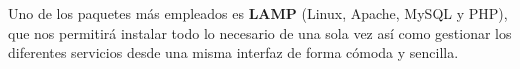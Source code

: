 Uno de los paquetes más empleados es \textbf{LAMP} (Linux, Apache, MySQL y PHP), que nos permitirá instalar todo lo necesario de una sola vez así como gestionar los diferentes servicios desde una misma interfaz de forma cómoda y sencilla.



\glsaddall
\printglossaries


\newpage
{}



